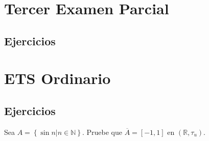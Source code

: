 \documentclass[12pt]{report}
\theoremstyle{largebreak}
\newcommand{\Cls}[1]{\ensuremath{\overline{#1}}}
\begin{document}
    \chapter{Tercer Examen Parcial}

    \section{Ejercicios}
    
    \begin{excer}
        
    \end{excer}

    \chapter{ETS Ordinario}

    \section{Ejercicios}

    \begin{excer}
        Sea $A=\left\{\sin n\Big|n\in\mathbb{N} \right\}$. Pruebe que $\Cls{A}=[-1,1]$ en $(\mathbb{R},\tau_u)$.
    \end{excer}
\end{document}
